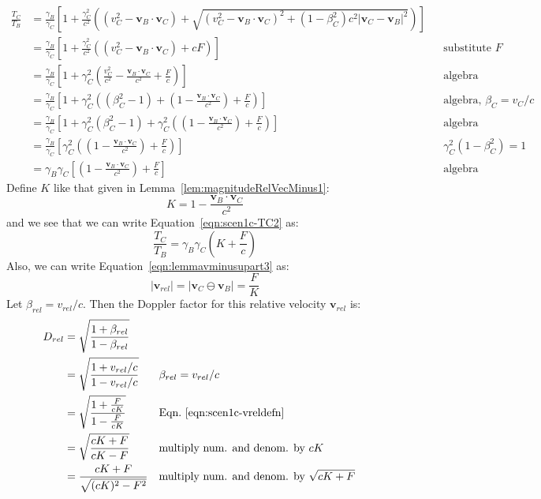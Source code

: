 \documentclass[a4paper]{article}
\theoremstyle{plain}
\theoremstyle{definition}
\newcommand{\vect}[1]{\mathbf{#1}}
\begin{document}
\begin{align}
\frac{T_C}{T_B}
  & = \frac{\gamma_B}{\gamma_C} \left[ 1 + \frac{\gamma_C^2}{c^2} \left( (v_C^2 - \vect{v}_B \cdot \vect{v}_C) + \sqrt{(v_C^2 - \vect{v}_B \cdot \vect{v}_C)^2  + (1-\beta_C^2)c^2 |\vect{v}_C - \vect{v}_B|^2} \right) \right] \nonumber \\
  & = \frac{\gamma_B}{\gamma_C} \left[ 1 + \frac{\gamma_C^2}{c^2} \left( (v_C^2 - \vect{v}_B \cdot \vect{v}_C) + cF \right) \right] & & \text{substitute $F$} \nonumber \\
  & = \frac{\gamma_B}{\gamma_C} \left[ 1 + \gamma_C^2 \left( \frac{v_C^2}{c^2} - \frac{\vect{v}_B \cdot \vect{v}_C}{c^2} + \frac{F}{c} \right) \right] & & \text{algebra} \nonumber \\
  & = \frac{\gamma_B}{\gamma_C} \left[ 1 + \gamma_C^2 \left( (\beta_C^2 - 1) + (1 - \frac{\vect{v}_B \cdot \vect{v}_C}{c^2}) + \frac{F}{c} \right) \right] & & \text{algebra, $\beta_C=v_C/c$} \nonumber \\
  & = \frac{\gamma_B}{\gamma_C} \left[ 1 + \gamma_C^2 (\beta_C^2 - 1) + \gamma_C^2 \left( (1 - \frac{\vect{v}_B \cdot \vect{v}_C}{c^2}) + \frac{F}{c} \right) \right] & & \text{algebra} \nonumber \\
  & = \frac{\gamma_B}{\gamma_C} \left[ \gamma_C^2 \left( (1 - \frac{\vect{v}_B \cdot \vect{v}_C}{c^2}) + \frac{F}{c} \right) \right] & & \text{$\gamma_C^2 (1-\beta_C^2) = 1$} \nonumber \\
  & = \gamma_B \gamma_C \left[ (1 - \frac{\vect{v}_B \cdot \vect{v}_C}{c^2}) + \frac{F}{c} \right] & & \text{algebra} \label{eqn:scen1c-TC2}
\end{align}
Define $K$ like that given in Lemma~\ref{lem:magnitudeRelVecMinus1}:
\begin{equation}
K = 1 - \frac{\vect{v}_B \cdot \vect{v}_C}{c^2} \nonumber
\end{equation}
and we see that we can write Equation~\eqref{eqn:scen1c-TC2} as:
\begin{equation}
\frac{T_C}{T_B}
  = \gamma_B \gamma_C \left( K + \frac{F}{c} \right) \label{eqn:scen1c-TC3}
\end{equation}
Also, we can write Equation~\eqref{eqn:lemmavminusupart3} as:
\begin{equation}
|\vect{v}_{rel}| = |\vect{v}_C \ominus \vect{v}_B| = \frac{F}{K} \label{eqn:scen1c-vreldefn}
\end{equation}
Let $\beta_{rel} = v_{rel}/c$.  Then the Doppler factor for this
relative velocity $\vect{v}_{rel}$ is:
\begin{align}
D_{rel}
  & = \sqrt{ \frac{1+\beta_{rel}}{1-\beta_{rel}} } \nonumber \\
  & = \sqrt{ \frac{1+v_{rel}/c}{1-v_{rel}/c} } & & \text{$\beta_{rel}=v_{rel}/c$} \nonumber \\
  & = \sqrt{ \frac{1+\frac{F}{cK}}{1-\frac{F}{cK}} } & & \text{Eqn.~\eqref{eqn:scen1c-vreldefn}} \nonumber \\
  & = \sqrt{ \frac{cK+F}{cK-F} } & & \text{multiply num. and denom. by $cK$} \nonumber \\
  & = \frac{cK+F}{\sqrt{ (cK)^2 - F^2 }} & & \text{multiply num. and denom. by $\sqrt{cK+F}$} \label{scen1c:dopplerfactor1}
\end{align}
\end{document}
